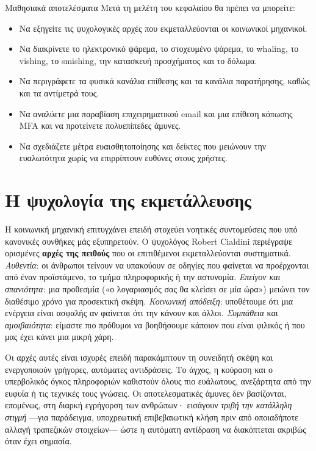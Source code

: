 \documentclass[11pt,openany]{book}
\begin{document}
\begin{outcomesbox}{Μαθησιακά αποτελέσματα}
Μετά τη μελέτη του κεφαλαίου θα πρέπει να μπορείτε:
\begin{itemize}
  \item Να εξηγείτε τις ψυχολογικές αρχές που εκμεταλλεύονται οι κοινωνικοί μηχανικοί.
  \item Να διακρίνετε το ηλεκτρονικό ψάρεμα, το στοχευμένο ψάρεμα, το whaling, το vishing, το smishing, την κατασκευή προσχήματος και το δόλωμα.
  \item Να περιγράφετε τα φυσικά κανάλια επίθεσης και τα κανάλια παρατήρησης, καθώς και τα αντίμετρά τους.
  \item Να αναλύετε μια παραβίαση επιχειρηματικού email και μια επίθεση κόπωσης MFA και να προτείνετε πολυεπίπεδες άμυνες.
  \item Να σχεδιάζετε μέτρα ευαισθητοποίησης και δείκτες που μειώνουν την ευαλωτότητα χωρίς να επιρρίπτουν ευθύνες στους χρήστες.
\end{itemize}
\end{outcomesbox}

\section{Η ψυχολογία της εκμετάλλευσης}\label{sec:5.1}
Η κοινωνική μηχανική επιτυγχάνει επειδή στοχεύει νοητικές συντομεύσεις που υπό κανονικές συνθήκες μάς εξυπηρετούν. Ο ψυχολόγος Robert Cialdini περιέγραψε ορισμένες \textbf{αρχές της πειθούς} που οι επιτιθέμενοι εκμεταλλεύονται συστηματικά. \emph{Αυθεντία}: οι άνθρωποι τείνουν να υπακούουν σε οδηγίες που φαίνεται να προέρχονται από έναν προϊστάμενο, το τμήμα πληροφορικής ή την αστυνομία. \emph{Επείγον και σπανιότητα}: μια προθεσμία («ο λογαριασμός σας θα κλείσει σε μία ώρα») μειώνει τον διαθέσιμο χρόνο για προσεκτική σκέψη. \emph{Κοινωνική απόδειξη}: υποθέτουμε ότι μια ενέργεια είναι ασφαλής αν φαίνεται ότι την κάνουν και άλλοι. \emph{Συμπάθεια} και \emph{αμοιβαιότητα}: είμαστε πιο πρόθυμοι να βοηθήσουμε κάποιον που είναι φιλικός ή που μας έχει κάνει μια μικρή χάρη.

Οι αρχές αυτές είναι ισχυρές επειδή παρακάμπτουν τη συνειδητή σκέψη και ενεργοποιούν γρήγορες, αυτόματες αντιδράσεις. Το άγχος, η κούραση και ο υπερβολικός όγκος πληροφοριών καθιστούν όλους πιο ευάλωτους, ανεξάρτητα από την ευφυΐα ή τις τεχνικές τους γνώσεις. Οι αποτελεσματικές άμυνες δεν βασίζονται, επομένως, στη διαρκή εγρήγορση των ανθρώπων· εισάγουν \emph{τριβή την κατάλληλη στιγμή} —για παράδειγμα, υποχρεωτική επιβεβαιωτική κλήση πριν από οποιαδήποτε αλλαγή τραπεζικών στοιχείων— ώστε η αυτόματη αντίδραση να διακόπτεται ακριβώς όταν έχει σημασία.
\end{document}
